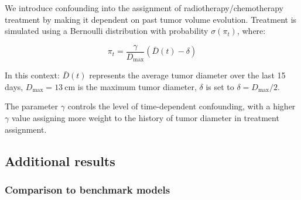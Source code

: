 \documentclass{article}
\theoremstyle{plain}
\theoremstyle{definition}
\theoremstyle{remark}
\begin{document}
We introduce confounding into the assignment of radiotherapy/chemotherapy treatment by making it dependent on past tumor volume evolution. Treatment is simulated using a Bernoulli distribution with probability \( \sigma(\pi_t) \), where:

\begin{equation}
\pi_t = \frac{\gamma}{D_{\max}}\left(\bar{D}(t) - \delta\right)
\end{equation}

In this context:
\( \bar{D}(t) \) represents the average tumor diameter over the last 15 days,
\( D_{\max} = 13~\text{cm} \) is the maximum tumor diameter,
\( \delta \) is set to \( \delta = D_{\max}/2 \).

The parameter \( \gamma \) controls the level of time-dependent confounding, with a higher \( \gamma \) value assigning more weight to the history of tumor diameter in treatment assignment.

\subsection{Additional results}
\label{subsect: detailed_results_cancer}
\subsubsection{Comparison to benchmark models}
\label{subsect: benchmark_few_data_cancer}
\end{document}
